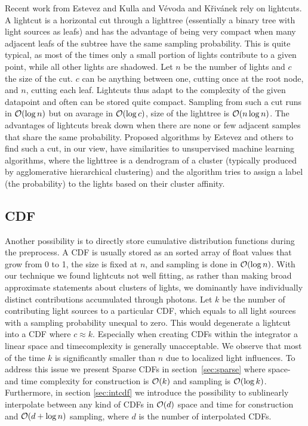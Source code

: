 Recent work from Estevez and Kulla \cite{Estevez} and Vévoda and Křivánek \cite{Vevoda} rely on lightcuts. A lightcut is a horizontal cut through a lighttree (essentially a binary tree with light sources as leafs) and has the advantage of being very compact when many adjacent leafs of the subtree have the same sampling probability. This is quite typical, as most of the times only a small portion of lights contribute to a given point, while all other lights are shadowed. Let $n$ be the number of lights and $c$ the size of the cut. $c$ can be anything between one, cutting once at the root node, and $n$, cutting each leaf. Lightcuts thus adapt to the complexity of the given datapoint and often can be stored quite compact. Sampling from such a cut runs in $\mathcal{O}(\log{n})$ but on avarage in $\mathcal{O}(\log{c})$, size of the lighttree is $\mathcal{O}(n\log{n})$. The advantages of lightcuts break down when there are none or few adjacent samples that share the same probability. Proposed algorithms by Estevez \cite{Estevez} and others to find such a cut, in our view, have similarities to unsupervised machine learning algorithms, where the lighttree is a dendrogram of a cluster (typically produced by agglomerative hierarchical clustering) and the algorithm tries to assign a label (the probability) to the lights based on their cluster affinity. 

\subsection{CDF}

Another possibility is to directly store cumulative distribution functions during the preprocess. A CDF is usually stored as an sorted array of float values that grow from 0 to 1, the size is fixed at $n$, and sampling is done in $\mathcal{O}(\log{n})$. With our technique we found lightcuts not well fitting, as rather than making broad approximate statements about clusters of lights, we dominantly have individually distinct contributions accumulated through photons. Let $k$ be the number of contributing light sources to a particular CDF, which equals to all light sources with a sampling probability unequal to zero. This would degenerate a lightcut into a CDF where $c \approx k$. Especially when creating CDFs within the integrator a linear space and timecomplexity is generally unacceptable. We observe that most of the time $k$ is significantly smaller than $n$ due to localized light influences. To address this issue we present Sparse CDFs in section~\ref{sec:sparse} where space- and time complexity for construction is $\mathcal{O}(k)$ and sampling is $\mathcal{O}(\log{k})$. Furthermore, in section \ref{sec:intcdf} we introduce the possibility to sublinearly interpolate between any kind of CDFs in $\mathcal{O}(d)$ space and time for construction and $\mathcal{O}(d + \log{n})$ sampling, where $d$ is the number of interpolated CDFs.

